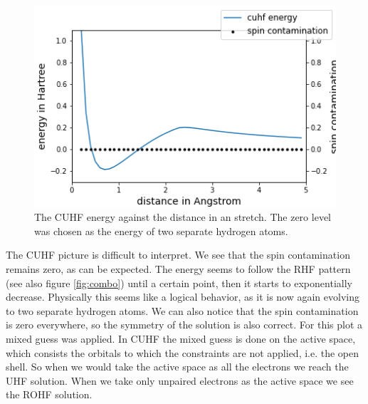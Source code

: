 \documentclass[twoside,twocolumn,9pt]{article}
\begin{document}
\begin{center}
  \begin{figure}[h]
    \includegraphics[width=\linewidth]{./../notes/figures/cuhf_mix.png}
    \caption{The CUHF energy against the distance in an  stretch. The zero level was chosen as the energy of two separate hydrogen atoms.}
    \label{fig:cuhfstretch}
  \end{figure}
\end{center}

The CUHF picture is difficult to interpret. We see that the spin contamination remains zero, as can be expected. The energy seems to follow the RHF pattern (see also figure 
\ref{fig:combo}) until a certain point, then it starts to exponentially decrease. Physically this seems like a logical behavior, as it is now again evolving to two separate hydrogen 
atoms. We can also notice
that the spin contamination is zero everywhere, so the symmetry of the solution is also correct. For this plot a mixed guess was applied. In CUHF the mixed guess is done on the
active space, which consists the orbitals to which the constraints are not applied, i.e. the open shell\cite{Scuseria2011}. So when we would take the active space as all the electrons
we reach the UHF solution. When we take only unpaired electrons as the active space we see the ROHF solution.
\end{document}
